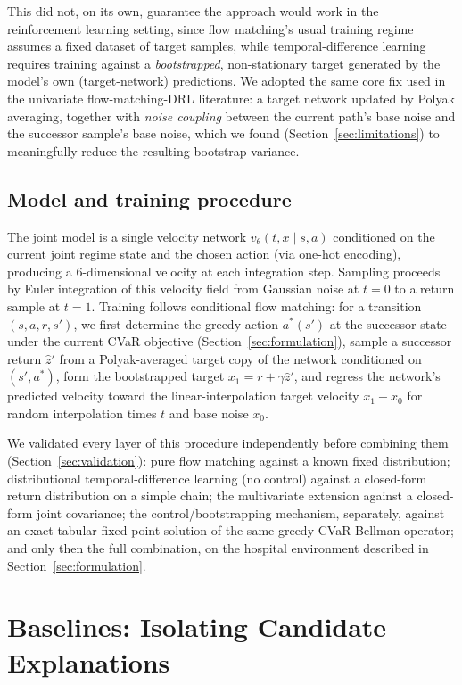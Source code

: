 \documentclass[11pt]{article}
\begin{document}
This did not, on its own, guarantee the approach would work in the reinforcement learning setting, since flow matching's usual training regime assumes a fixed dataset of target samples, while temporal-difference learning requires training against a \emph{bootstrapped}, non-stationary target generated by the model's own (target-network) predictions. We adopted the same core fix used in the univariate flow-matching-DRL literature: a target network updated by Polyak averaging, together with \emph{noise coupling} between the current path's base noise and the successor sample's base noise, which we found (Section~\ref{sec:limitations}) to meaningfully reduce the resulting bootstrap variance.

\subsection{Model and training procedure}
The joint model is a single velocity network $v_\theta(t, x \mid s, a)$ conditioned on the current joint regime state and the chosen action (via one-hot encoding), producing a $6$-dimensional velocity at each integration step. Sampling proceeds by Euler integration of this velocity field from Gaussian noise at $t=0$ to a return sample at $t=1$. Training follows conditional flow matching: for a transition $(s, a, r, s')$, we first determine the greedy action $a^\ast(s')$ at the successor state under the current CVaR objective (Section~\ref{sec:formulation}), sample a successor return $\hat z' $ from a Polyak-averaged target copy of the network conditioned on $(s', a^\ast)$, form the bootstrapped target $x_1 = r + \gamma \hat z'$, and regress the network's predicted velocity toward the linear-interpolation target velocity $x_1 - x_0$ for random interpolation times $t$ and base noise $x_0$.

We validated every layer of this procedure independently before combining them (Section~\ref{sec:validation}): pure flow matching against a known fixed distribution; distributional temporal-difference learning (no control) against a closed-form return distribution on a simple chain; the multivariate extension against a closed-form joint covariance; the control/bootstrapping mechanism, separately, against an exact tabular fixed-point solution of the same greedy-CVaR Bellman operator; and only then the full combination, on the hospital environment described in Section~\ref{sec:formulation}.

\section{Baselines: Isolating Candidate Explanations}
\label{sec:baselines}
\end{document}
